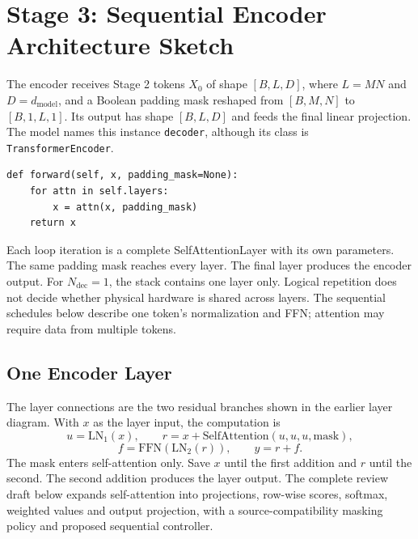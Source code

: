 \documentclass[11pt,a4paper]{article}
\begin{document}
\section{Stage 3: Sequential Encoder Architecture Sketch}

The encoder receives Stage 2 tokens $X_0$ of shape $[B,L,D]$, where
$L=MN$ and $D=d_{\mathrm{model}}$, and a Boolean padding mask reshaped
from $[B,M,N]$ to $[B,1,L,1]$. Its output has shape $[B,L,D]$ and feeds
the final linear projection. The model names this instance \texttt{decoder},
although its class is \texttt{TransformerEncoder}.

\begin{verbatim}
def forward(self, x, padding_mask=None):
    for attn in self.layers:
        x = attn(x, padding_mask)
    return x
\end{verbatim}

Each loop iteration is a complete SelfAttentionLayer with its own parameters.
The same padding mask reaches every layer. The final layer produces the
encoder output. For $N_{\mathrm{dec}}=1$, the stack contains one layer only.
Logical repetition does not decide whether physical hardware is shared across
layers. The sequential schedules below describe one token's normalization and
FFN; attention may require data from multiple tokens.

\begin{center}
\end{center}

\subsection{One Encoder Layer}

The layer connections are the two residual branches shown in the earlier
layer diagram. With $x$ as the layer input, the computation is
\[
u=\mathrm{LN}_1(x),\qquad
r=x+\mathrm{SelfAttention}(u,u,u,\mathrm{mask}),
\]
\[
f=\mathrm{FFN}(\mathrm{LN}_2(r)),\qquad y=r+f.
\]
The mask enters self-attention only. Save $x$ until the first addition and
$r$ until the second. The second addition produces the layer output.
The complete review draft below expands self-attention into projections,
row-wise scores, softmax, weighted values and output projection, with a
source-compatibility masking policy and proposed sequential controller.
\end{document}
